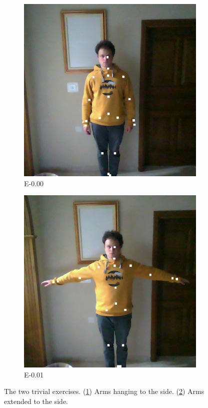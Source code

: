 \begin{figure}[ht]
  \centering
  \begin{subfigure}[b]{0.16\linewidth}
      \centering
      \includegraphics[width=\textwidth]{figures/samples/trivial/E-0.00_10.png}
      \caption[]{E-0.00}
      \label{fig:trivial_0}
  \end{subfigure}
  \hfill
  \begin{subfigure}[b]{0.16\linewidth}
      \centering
      \includegraphics[width=\textwidth]{figures/samples/trivial/E-0.01_38.png}
      \caption[]{E-0.01}
      \label{fig:trivial_1}
  \end{subfigure}
  \caption[Trivial Exercises]{The two trivial exercises. (\ref{fig:trivial_0}) Arms hanging to the side. (\ref{fig:trivial_1}) Arms extended to the side.}
  \label{fig:trivial_exercises}
\end{figure}  

